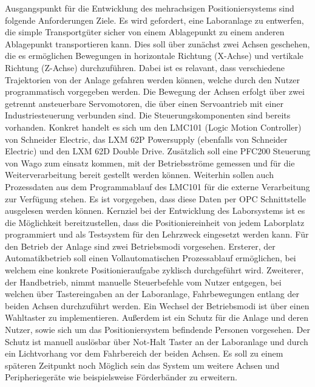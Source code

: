 \documentclass[../Bachelorarbeit.tex]{subfiles}
\begin{document}
Ausgangspunkt für die Entwicklung des mehrachsigen Positioniersystems sind folgende Anforderungen \bzw Ziele. Es wird gefordert, eine Laboranlage zu entwerfen, die simple Transportgüter sicher von einem Ablagepunkt zu einem anderen Ablagepunkt transportieren kann. Dies soll über zunächst zwei Achsen geschehen, die es ermöglichen Bewegungen in horizontale Richtung (X-Achse) und vertikale Richtung (Z-Achse) durchzuführen. Dabei ist es relavant, dass verschiedene Trajektorien von der Anlage gefahren werden können, welche durch den Nutzer programmatisch vorgegeben werden. Die Bewegung der Achsen erfolgt über zwei getrennt ansteuerbare Servomotoren, die über einen Servoantrieb mit einer Industriesteuerung verbunden sind. Die Steuerungskomponenten sind bereits vorhanden. Konkret handelt es sich um den LMC101 (Logic Motion Controller) von Schneider Electric, das LXM 62P Powersupply (ebenfalls von Schneider Electric) und den LXM 62D Double Drive. Zusätzlich soll eine PFC200 Steuerung von Wago zum einsatz kommen, mit der Betriebsströme gemessen und für die Weiterverarbeitung bereit gestellt werden können. Weiterhin sollen auch Prozessdaten aus dem Programmablauf des LMC101 für die externe Verarbeitung zur Verfügung stehen. Es ist vorgegeben, dass diese Daten per OPC Schnittstelle ausgelesen werden können. Kernziel bei der Entwicklung des Laborsystems ist es die Möglichkeit bereitzustellen, dass die Positioniereinheit von jedem Laborplatz programmiert und als Testsystem für den Lehrzweck eingesetzt werden kann. Für den Betrieb der Anlage sind zwei Betriebsmodi vorgesehen. Ersterer, der Automatikbetrieb soll einen Vollautomatischen Prozessablauf ermöglichen, bei welchem eine konkrete Positionieraufgabe zyklisch durchgeführt wird. Zweiterer, der Handbetrieb, nimmt manuelle Steuerbefehle vom Nutzer entgegen, bei welchen über Tastereingaben an der Laboranlage, Fahrbewegungen entlang der beiden Achsen durchzuführt werden. Ein Wechsel der Betriebsmodi ist über einen Wahltaster zu implementieren. Außerdem ist ein Schutz für die Anlage und deren Nutzer, sowie sich um das Positioniersystem befindende Personen vorgesehen. Der Schutz ist manuell auslösbar über Not-Halt Taster an der Laboranlage und durch ein Lichtvorhang vor dem Fahrbereich der beiden Achsen. Es soll zu einem späteren Zeitpunkt noch Möglich sein das System um weitere Achsen und Peripheriegeräte wie beispielsweise Förderbänder zu erweitern.
\end{document}
